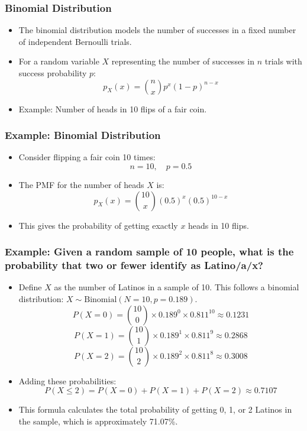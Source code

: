 \documentclass[handout]{beamer} %
\begin{document}
\begin{frame}
\frametitle{Binomial Distribution}
    \begin{itemize}
        \item The binomial distribution models the number of successes in a fixed number of independent Bernoulli trials. \pause
        \item For a random variable \( X \) representing the number of successes in \( n \) trials with success probability \( p \): \pause
        \[
        p_X(x) = \binom{n}{x} p^x (1-p)^{n-x}
        \] \pause
        \item Example: Number of heads in 10 flips of a fair coin.
    \end{itemize}
\end{frame}

\begin{frame}
\frametitle{Example: Binomial Distribution}
    \begin{itemize}
        \item Consider flipping a fair coin 10 times: \pause
        \[
        n = 10, \quad p = 0.5
        \] \pause
        \item The PMF for the number of heads \( X \) is: \pause
        \[
        p_X(x) = \binom{10}{x} (0.5)^x (0.5)^{10-x}
        \] \pause
        \item This gives the probability of getting exactly \( x \) heads in 10 flips.
    \end{itemize}
\end{frame}

\begin{frame}
\footnotesize
\frametitle{Example: Given a random sample of 10 people, what is the probability that two or fewer identify as Latino/a/x?}
    \begin{itemize}
        \setlength{\itemsep}{0pt} %
        \item Define \( X \) as the number of Latinos in a sample of 10. This follows a binomial distribution: \( X \sim \text{Binomial}(N=10, p=0.189) \). \pause
        \[
        P(X = 0) = \binom{10}{0} \times 0.189^0 \times 0.811^{10} \approx 0.1231
        \] \pause
        \[
        P(X = 1) = \binom{10}{1} \times 0.189^1 \times 0.811^{9} \approx 0.2868
        \] \pause
        \[
        P(X = 2) = \binom{10}{2} \times 0.189^2 \times 0.811^{8} \approx 0.3008
        \] \pause
        \item Adding these probabilities:
        \[
        P(X \leq 2) = P(X = 0) + P(X = 1) + P(X = 2) \approx 0.7107
        \]
        \item This formula calculates the total probability of getting 0, 1, or 2 Latinos in the sample, which is approximately 71.07\%.
    \end{itemize}
\end{frame}
\end{document}

